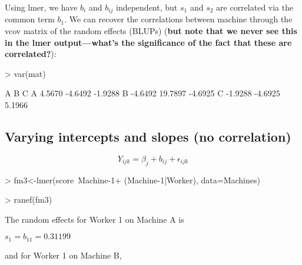 \documentclass[12pt]{amsart}
\begin{document}
Using lmer, we have $b_{i}$ and $b_{ij}$ independent, but $s_1$ and $s_2$ are
correlated via the common term $b_1$. We can recover the correlations between machine through the vcov matrix of the random effects (BLUPs) (\textbf{but note that we never see this in the lmer output---what's the significance of the fact that these are correlated?}):

\begin{Schunk}
\begin{Sinput}
> var(mat)
\end{Sinput}
\begin{Soutput}
        A       B       C
A  4.5670 -4.6492 -1.9288
B -4.6492 19.7897 -4.6925
C -1.9288 -4.6925  5.1966
\end{Soutput}
\end{Schunk}





\subsection{Varying intercepts and slopes (no correlation)}

\begin{equation}
Y_{ijk} = \beta_j + b_{ij} + \epsilon_{ijk}
\end{equation}



\begin{Schunk}
\begin{Sinput}
> fm3<-lmer(score~Machine-1+
               (Machine-1|Worker),
             data=Machines)
\end{Sinput}
\end{Schunk}

\begin{Schunk}
\begin{Sinput}
> ranef(fm3)
\end{Sinput}
\end{Schunk}

The random effects for Worker 1 on Machine A is

$s_1 = b_{11}=0.31199$

and for Worker 1 on Machine B,
\end{document}

